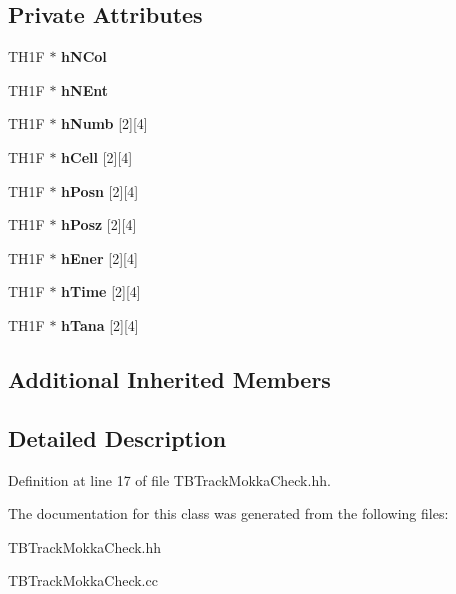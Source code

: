 \subsection*{Private Attributes}
\begin{DoxyCompactItemize}
\item 
T\-H1\-F $\ast$ {\bfseries h\-N\-Col}\label{classTBTrackMokkaCheck_a0c9c9c99f9b716dd1992bb4ef4dc9752}

\item 
T\-H1\-F $\ast$ {\bfseries h\-N\-Ent}\label{classTBTrackMokkaCheck_a82a95f726f0c9a6143a9841194f99352}

\item 
T\-H1\-F $\ast$ {\bfseries h\-Numb} [2][4]\label{classTBTrackMokkaCheck_a4b8496fa6e482d1b766d2a1bc4ea5601}

\item 
T\-H1\-F $\ast$ {\bfseries h\-Cell} [2][4]\label{classTBTrackMokkaCheck_a8039a6724748c468801aed23e01069da}

\item 
T\-H1\-F $\ast$ {\bfseries h\-Posn} [2][4]\label{classTBTrackMokkaCheck_a18d21b8473903ebd1064262b5845411d}

\item 
T\-H1\-F $\ast$ {\bfseries h\-Posz} [2][4]\label{classTBTrackMokkaCheck_a1bf5a8ba5867ded6b37099192f65f233}

\item 
T\-H1\-F $\ast$ {\bfseries h\-Ener} [2][4]\label{classTBTrackMokkaCheck_a206f00deb9d1f038f90c298885089a00}

\item 
T\-H1\-F $\ast$ {\bfseries h\-Time} [2][4]\label{classTBTrackMokkaCheck_a041d981e1fcd92559e117112986ef83d}

\item 
T\-H1\-F $\ast$ {\bfseries h\-Tana} [2][4]\label{classTBTrackMokkaCheck_aca36bbd029605cb2ae4a0ca7c575ca65}

\end{DoxyCompactItemize}
\subsection*{Additional Inherited Members}


\subsection{Detailed Description}


Definition at line 17 of file T\-B\-Track\-Mokka\-Check.\-hh.



The documentation for this class was generated from the following files\-:\begin{DoxyCompactItemize}
\item 
T\-B\-Track\-Mokka\-Check.\-hh\item 
T\-B\-Track\-Mokka\-Check.\-cc\end{DoxyCompactItemize}
